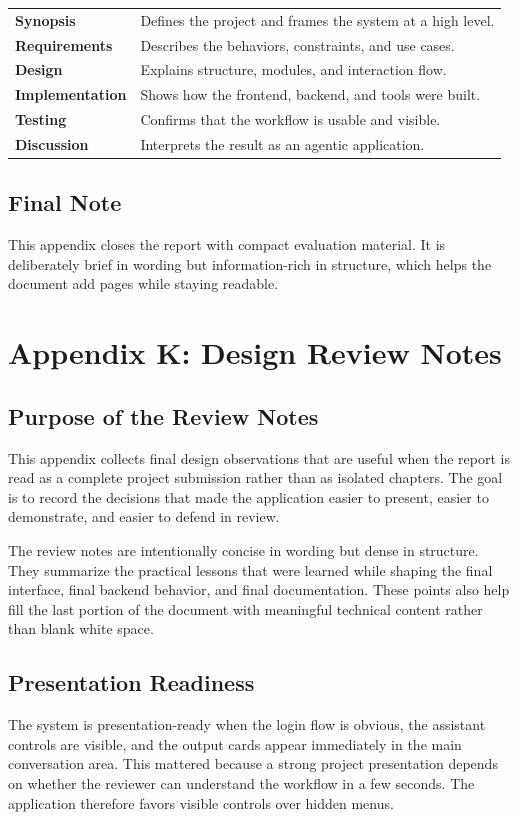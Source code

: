 \documentclass[11pt,oneside]{report}
\begin{document}
\begin{tabularx}{\textwidth}{>{\bfseries}p{}X}
Synopsis & Defines the project and frames the system at a high level. \\
Requirements & Describes the behaviors, constraints, and use cases. \\
Design & Explains structure, modules, and interaction flow. \\
Implementation & Shows how the frontend, backend, and tools were built. \\
Testing & Confirms that the workflow is usable and visible. \\
Discussion & Interprets the result as an agentic application. \\
\end{tabularx}

\section{Final Note}
This appendix closes the report with compact evaluation material. It is deliberately brief in wording but information-rich in structure, which helps the document add pages while staying readable.

\chapter{Appendix K: Design Review Notes}
\section{Purpose of the Review Notes}
This appendix collects final design observations that are useful when the report is read as a complete project submission rather than as isolated chapters. The goal is to record the decisions that made the application easier to present, easier to demonstrate, and easier to defend in review.

The review notes are intentionally concise in wording but dense in structure. They summarize the practical lessons that were learned while shaping the final interface, final backend behavior, and final documentation. These points also help fill the last portion of the document with meaningful technical content rather than blank white space.

\section{Presentation Readiness}
The system is presentation-ready when the login flow is obvious, the assistant controls are visible, and the output cards appear immediately in the main conversation area. This mattered because a strong project presentation depends on whether the reviewer can understand the workflow in a few seconds. The application therefore favors visible controls over hidden menus.
\end{document}
